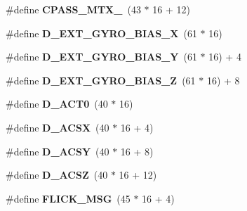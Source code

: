 \begin{DoxyCompactItemize}
\item 
\#define {\bfseries C\+P\+A\+S\+S\+\_\+\+M\+T\+X\+\_}~(43 $\ast$ 16 + 12)\hypertarget{group___d_r_i_v_e_r_s_gab45a80c778b591671aa8f10a64209423}{}\label{group___d_r_i_v_e_r_s_gab45a80c778b591671aa8f10a64209423}

\item 
\#define {\bfseries D\+\_\+\+E\+X\+T\+\_\+\+G\+Y\+R\+O\+\_\+\+B\+I\+A\+S\+\_\+X}~(61 $\ast$ 16)\hypertarget{group___d_r_i_v_e_r_s_gae48ad5d76a4abec0759ff23ba2b2a68e}{}\label{group___d_r_i_v_e_r_s_gae48ad5d76a4abec0759ff23ba2b2a68e}

\item 
\#define {\bfseries D\+\_\+\+E\+X\+T\+\_\+\+G\+Y\+R\+O\+\_\+\+B\+I\+A\+S\+\_\+Y}~(61 $\ast$ 16) + 4\hypertarget{group___d_r_i_v_e_r_s_ga6de6f7302f19c1f63f1a04b51ff14b1a}{}\label{group___d_r_i_v_e_r_s_ga6de6f7302f19c1f63f1a04b51ff14b1a}

\item 
\#define {\bfseries D\+\_\+\+E\+X\+T\+\_\+\+G\+Y\+R\+O\+\_\+\+B\+I\+A\+S\+\_\+Z}~(61 $\ast$ 16) + 8\hypertarget{group___d_r_i_v_e_r_s_gacd6dead1c0b0458f1ec5d66914a1cf90}{}\label{group___d_r_i_v_e_r_s_gacd6dead1c0b0458f1ec5d66914a1cf90}

\item 
\#define {\bfseries D\+\_\+\+A\+C\+T0}~(40 $\ast$ 16)\hypertarget{group___d_r_i_v_e_r_s_ga5d68a8e4a168cc789fb481ba9b1ac431}{}\label{group___d_r_i_v_e_r_s_ga5d68a8e4a168cc789fb481ba9b1ac431}

\item 
\#define {\bfseries D\+\_\+\+A\+C\+SX}~(40 $\ast$ 16 + 4)\hypertarget{group___d_r_i_v_e_r_s_ga3d6aba10b057d1b66f0c5f33334afb07}{}\label{group___d_r_i_v_e_r_s_ga3d6aba10b057d1b66f0c5f33334afb07}

\item 
\#define {\bfseries D\+\_\+\+A\+C\+SY}~(40 $\ast$ 16 + 8)\hypertarget{group___d_r_i_v_e_r_s_ga289d47aab7f881d4e0c1233229462644}{}\label{group___d_r_i_v_e_r_s_ga289d47aab7f881d4e0c1233229462644}

\item 
\#define {\bfseries D\+\_\+\+A\+C\+SZ}~(40 $\ast$ 16 + 12)\hypertarget{group___d_r_i_v_e_r_s_gaae2baed3a317cde49f3ab8af10e73e97}{}\label{group___d_r_i_v_e_r_s_gaae2baed3a317cde49f3ab8af10e73e97}

\item 
\#define {\bfseries F\+L\+I\+C\+K\+\_\+\+M\+SG}~(45 $\ast$ 16 + 4)\hypertarget{group___d_r_i_v_e_r_s_ga045a0c3dbfc3523917e914681f437c3f}{}\label{group___d_r_i_v_e_r_s_ga045a0c3dbfc3523917e914681f437c3f}


\end{DoxyCompactItemize}

